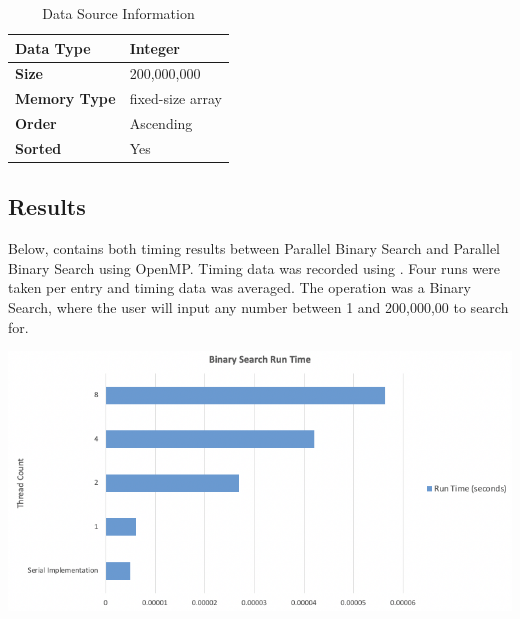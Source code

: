 \documentclass[fleqn,10pt]{wlscirep}
\begin{document}
\begin{table}[H]
\begin{tabular}{@{}ll@{}}
\toprule
\textbf{Data Type}   & Integer          \\ \midrule
\textbf{Size}        & 200,000,000      \\ \midrule
\textbf{Memory Type} & fixed-size array \\ \midrule
\textbf{Order}       & Ascending        \\ \midrule
\textbf{Sorted}      & Yes              \\
\bottomrule
\end{tabular}
    \caption{Data Source Information}
\end{table}



\subsection*{Results}
Below, contains both timing results between Parallel Binary Search and Parallel Binary Search using OpenMP. Timing data was recorded using . Four runs were taken per entry and timing data was averaged. The operation was a Binary Search, where the user will input any number between 1 and 200,000,00 to search for.

\vspace*{20px}

\includegraphics[scale=0.6]{runtime.png}
\vspace*{20px}
\end{document}
